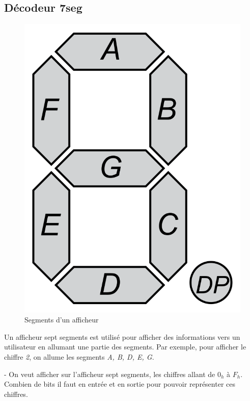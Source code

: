 \newpage

\subsection{Décodeur 7seg}

\begin{figure}[ht]
    \centering
    \includegraphics[scale = 0.1]{img/SevenSegDisplay.png}
    \caption{Segments d'un afficheur}
    \label{fig:seven_segment_display}
\end{figure}

Un afficheur sept segments est utilisé pour afficher des informations vers un utilisateur en allumant une partie des segments. Par exemple, pour afficher le chiffre \textit{2}, on allume les segments \textit{A, B, D, E, G}.

\medskip

- On veut afficher sur l'afficheur sept segments, les chiffres allant de $0_h$ à $F_h$. Combien de bits il faut en entrée et en sortie pour pouvoir représenter ces chiffres.


